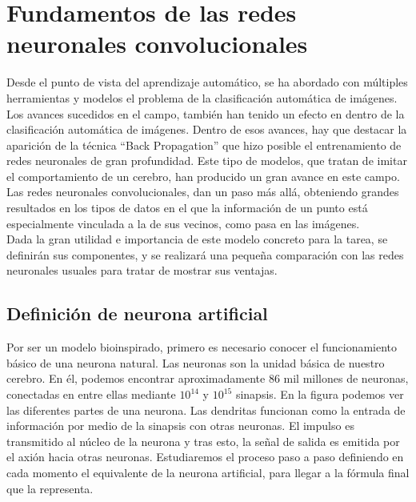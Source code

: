 \section{Fundamentos de las redes neuronales convolucionales}
Desde el punto de vista del aprendizaje automático, se ha abordado con múltiples herramientas y modelos el problema de la clasificación automática de imágenes. Los avances sucedidos en el campo, también han tenido un efecto en dentro de la clasificación automática de imágenes. Dentro de esos avances, hay que destacar la aparición de la técnica ``Back Propagation'' que hizo posible el entrenamiento de redes neuronales de gran profundidad. Este tipo de modelos, que tratan de imitar el comportamiento de un cerebro, han producido un gran avance en este campo.\\

Las redes neuronales convolucionales, dan un paso más allá, obteniendo grandes resultados en los tipos de datos en el que la información de un punto está especialmente vinculada a la de sus vecinos, como pasa en las imágenes.\\
 
Dada la gran utilidad e importancia de este modelo concreto para la tarea, se definirán sus componentes, y se realizará una pequeña comparación con las redes neuronales usuales para tratar de mostrar sus ventajas.\\

\subsection{Definición de neurona artificial}

Por ser un modelo bioinspirado, primero es necesario conocer el funcionamiento básico de una neurona natural. Las neuronas son la unidad básica de nuestro cerebro. En él, podemos encontrar aproximadamente 86 mil millones de neuronas, conectadas en entre ellas mediante $10^{14}$ y $10^{15}$ sinapsis. En la figura  podemos ver las diferentes partes de una neurona. Las dendritas funcionan como la entrada de información por medio de la sinapsis con otras neuronas. El impulso es transmitido al núcleo de la neurona y tras esto, la señal de salida es emitida por el axión hacia otras neuronas. Estudiaremos el proceso paso a paso definiendo en cada momento el equivalente de la neurona artificial, para llegar a la fórmula final que la representa.\\

